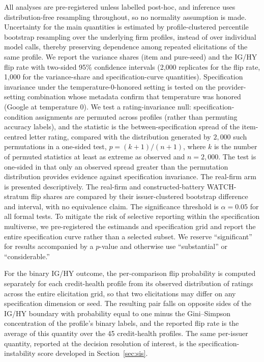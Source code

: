 \documentclass[a4paper,fleqn]{cas-sc}
\begin{document}
All analyses are pre-registered unless labelled post-hoc, and inference uses distribution-free resampling
throughout, so no normality assumption is made. Uncertainty for the main quantities is estimated by
profile-clustered percentile bootstrap resampling over the underlying firm profiles, instead of over
individual model calls, thereby preserving dependence among repeated elicitations of the same profile. We
report the variance shares (item and pure-seed) and the IG/HY flip rate with
two-sided 95\% confidence intervals (2{,}000 replicates for the flip rate, 1{,}000 for the
variance-share and specification-curve quantities). Specification invariance under the temperature-0-honored
setting is tested on the provider-setting combination whose metadata confirm that temperature was
honored (Google at temperature 0). We test a rating-invariance null: specification-condition assignments
are permuted across profiles (rather than permuting accuracy labels), and the statistic is the
between-specification spread of the item-centred letter rating, compared with the distribution generated
by $2{,}000$ such permutations in a one-sided test, $p=(k{+}1)/(n{+}1)$, where $k$ is the number of
permuted statistics at least as extreme as observed and $n=2{,}000$. The test is one-sided in that only an
observed spread greater than the permutation distribution provides evidence against specification
invariance. The real-firm arm is presented descriptively. The real-firm and constructed-battery
WATCH-stratum flip shares are compared by their issuer-clustered bootstrap difference and interval, with
no equivalence claim. The significance threshold is $\alpha=0.05$ for all
formal tests. To mitigate the risk of selective reporting within the specification multiverse, we
pre-registered the estimands and specification grid and report the entire specification curve rather than
a selected subset. We reserve ``significant'' for results accompanied by a $p$-value and otherwise use
``substantial'' or ``considerable.''

For the binary IG/HY outcome, the per-comparison flip probability is computed separately for each
credit-health profile from its observed distribution of ratings across the entire elicitation grid, so
that two elicitations may differ on any specification dimension or seed. The resulting pair falls on
opposite sides of the IG/HY boundary with probability equal to one minus the Gini--Simpson concentration
of the profile's binary labels, and the reported flip rate is the average of this quantity over the 45
credit-health profiles. The same per-issuer quantity, reported at the decision resolution of interest, is
the specification-instability score developed in Section~\ref{sec:sis}.
\end{document}
